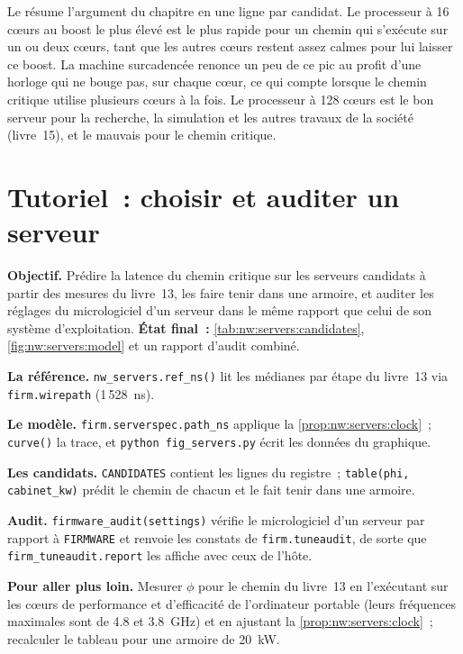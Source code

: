 Le  résume l'argument du chapitre en une ligne par candidat. Le processeur à 16 cœurs au boost le plus élevé est le plus rapide
pour un chemin qui s'exécute sur un ou deux cœurs, tant que les autres cœurs restent assez calmes pour lui laisser ce boost. La machine surcadencée renonce
un peu de ce pic au profit d'une horloge qui ne bouge pas, sur chaque cœur, ce qui compte lorsque le chemin critique utilise plusieurs cœurs à la fois. Le
processeur à 128 cœurs est le bon serveur pour la recherche, la simulation et les autres travaux de la société (livre~15), et le mauvais pour le
chemin critique.

\section{Tutoriel~: choisir et auditer un serveur}\label{tut:nw:servers:tut}

\begin{tutorial}
\textbf{Objectif.} Prédire la latence du chemin critique sur les serveurs candidats à partir des mesures du livre~13, les faire tenir dans une armoire, et auditer les
réglages du micrologiciel d'un serveur dans le même rapport que celui de son système d'exploitation. \textbf{État final~:} \cref{tab:nw:servers:candidates},
\cref{fig:nw:servers:model} et un rapport d'audit combiné.
\begin{tutsteps}
\item \textbf{La référence.} \texttt{nw\_servers.ref\_ns()} lit les médianes par étape du livre~13 via \texttt{firm.wirepath} (1\,528~ns).
\item \textbf{Le modèle.} \texttt{firm.serverspec.path\_ns} applique la \cref{prop:nw:servers:clock}~; \texttt{curve()} la trace, et
  \texttt{python fig\_servers.py} écrit les données du graphique.
\item \textbf{Les candidats.} \texttt{CANDIDATES} contient les lignes du registre~; \texttt{table(phi, cabinet\_kw)} prédit le chemin de chacun et le fait
  tenir dans une armoire.
\item \textbf{Audit.} \texttt{firmware\_audit(settings)} vérifie le micrologiciel d'un serveur par rapport à \texttt{FIRMWARE} et renvoie
  les constats de \texttt{firm.tuneaudit}, de sorte que \texttt{firm\_tuneaudit.report} les affiche avec ceux de l'hôte.
\end{tutsteps}
\textbf{Pour aller plus loin.} Mesurer $\phi$ pour le chemin du livre~13 en l'exécutant sur les cœurs de performance et d'efficacité de l'ordinateur portable (leurs
fréquences maximales sont de 4.8 et 3.8~GHz) et en ajustant la \cref{prop:nw:servers:clock}~; recalculer le tableau pour une armoire de 20~kW.
\end{tutorial}

